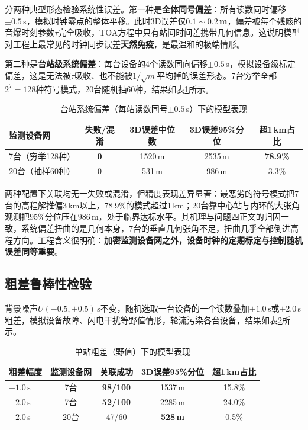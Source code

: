 \documentclass[draft,12pt,a4paper]{ctexart}
\theoremstyle{definition}
\begin{document}
分两种典型形态检验系统性误差。第一种是\textbf{全体同号偏差}：所有读数同时偏移$\pm0.5$\,s，模拟时钟零点的整体平移。此时3D误差仅\textbf{$0.1\sim0.2$\,m}，偏差被每个残骸的音爆时刻参数$\tau$完全吸收，TOA方程中只有站间时间差携带几何信息。这说明模型对工程上最常见的时钟同步误差\textbf{天然免疫}，是最温和的极端情形。

第二种是\textbf{台站级系统偏差}：每台设备的4个读数同向偏移$\pm0.5$\,s，模拟设备级标定偏差，这是无法被$\tau$吸收、也不能被$1/\sqrt{m}$平均掉的误差形态。7台穷举全部$2^7=128$种符号模式，20台随机抽60种，结果如表\ref{tab:test-sysbias}所示。

\begin{table}[H]\centering
  \caption{台站系统偏差（每站读数同号$\pm0.5$\,s）下的模型表现}\label{tab:test-sysbias}
  \small
  \begin{tabular}{lcccc}
    \toprule
    \textbf{监测设备网} & \textbf{失败/混淆} & \textbf{3D误差中位数} & \textbf{3D误差95\%分位} & \textbf{超1\,km占比} \\
    \midrule
    7台（穷举128种） & \textbf{0} & 1520\,m & 2535\,m & \textbf{78.9\%} \\
    20台（抽样60种） & 0 & 531\,m & 986\,m & 3.3\% \\
    \bottomrule
  \end{tabular}
\end{table}

两种配置下关联均无一失败或混淆，但精度表现差异显著：最恶劣的符号模式把7台的高程解推偏3\,km以上，$78.9\%$的模式超过1\,km；20台靠中心站与内环的大张角观测把95\%分位压在$986$\,m，处于临界达标水平。其机理与问题四正文的归因一致，系统偏差扭曲的是几何本身，7台的垂直几何张角不足，扭曲几乎全部倒进高程方向。工程含义很明确：\textbf{加密监测设备网之外，设备时钟的定期标定与控制随机误差同等重要}。

\subsection{粗差鲁棒性检验}

背景噪声$U(-0.5,+0.5)$\,s不变，随机选取一台设备的一个读数叠加$+1.0$\,s或$+2.0$\,s粗差，模拟设备故障、闪电干扰等野值情形，轮流污染各台设备，结果如表\ref{tab:test-outlier}所示。

\begin{table}[H]\centering
  \caption{单站粗差（野值）下的模型表现}\label{tab:test-outlier}
  \small
  \begin{tabular}{lcccc}
    \toprule
    \textbf{粗差幅度} & \textbf{监测设备网} & \textbf{关联成功} & \textbf{3D误差95\%分位} & \textbf{超1\,km占比} \\
    \midrule
    $+1.0$\,s & 7台 & \textbf{98/100} & 1537\,m & 15.8\% \\
    $+2.0$\,s & 7台 & \textbf{52/100} & 2285\,m & 24.0\% \\
    $+2.0$\,s & 20台 & 47/60 & \textbf{528\,m} & 0.5\% \\
    \bottomrule
  \end{tabular}
\end{table}
\end{document}
